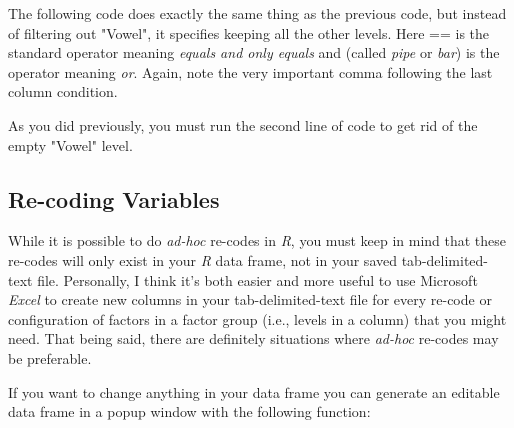 \documentclass[
  12pt,
  letterpaper]{article}
\newenvironment{Shaded}{\begin{snugshade}}{\end{snugshade}}
\newcommand{\FunctionTok}[1]{\textcolor[rgb]{0.28,0.35,0.67}{#1}}
\newcommand{\NormalTok}[1]{\textcolor[rgb]{0.00,0.23,0.31}{#1}}
\newcommand{\OtherTok}[1]{\textcolor[rgb]{0.00,0.23,0.31}{#1}}
\newcommand{\SpecialCharTok}[1]{\textcolor[rgb]{0.37,0.37,0.37}{#1}}
\newcommand{\StringTok}[1]{\textcolor[rgb]{0.13,0.47,0.30}{#1}}
\renewcommand\texttt[1]{{\ttfamily\color{BrickRed}#1}}
\begin{document}
The following code does exactly the same thing as the previous code, but
instead of filtering out \texttt{"Vowel"}, it specifies keeping all the
other levels. Here \texttt{==} is the standard operator meaning
\emph{equals and only equals} and \texttt{\textbar{}} (called
\emph{pipe} or \emph{bar}) is the operator meaning \emph{or}. Again,
note the very important comma following the last column condition.

\begin{Shaded}
\end{Shaded}

As you did previously, you must run the second line of code to get rid
of the empty \texttt{"Vowel"} level.

\hypertarget{re-coding-variables}{%
\subsection{Re-coding Variables}\label{re-coding-variables}}

While it is possible to do \emph{ad-hoc} re-codes in \emph{R}, you must
keep in mind that these re-codes will only exist in your \emph{R} data
frame, not in your saved tab-delimited-text file. Personally, I think
it's both easier and more useful to use Microsoft \emph{Excel} to create
new columns in your tab-delimited-text file for every re-code or
configuration of factors in a factor group (i.e., levels in a column)
that you might need. That being said, there are definitely situations
where \emph{ad-hoc} re-codes may be preferable.

If you want to change anything in your data frame you can generate an
editable data frame in a popup window with the following function:
\end{document}
